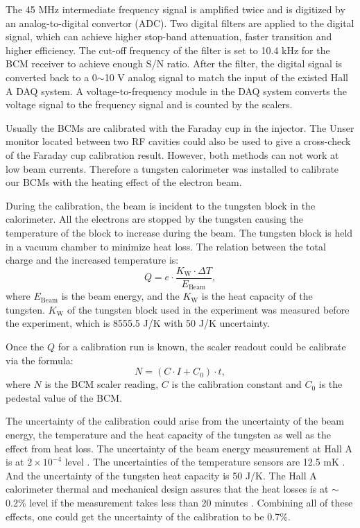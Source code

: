 The 45 MHz intermediate frequency signal is amplified twice and is digitized by an analog-to-digital convertor (ADC). Two digital filters are applied to the digital signal, which can achieve higher stop-band attenuation, faster transition and higher efficiency. The cut-off frequency of the filter is set to 10.4 kHz for the BCM receiver to achieve enough S/N ratio. After the filter, the digital signal is converted back to a 0$\sim$10 V analog signal to match the input of the existed Hall A DAQ system. A voltage-to-frequency module in the DAQ system converts the voltage signal to the frequency signal and is counted by the scalers.

Usually the BCMs are calibrated with the Faraday cup in the injector. The Unser monitor located between two RF cavities could also be used to give a cross-check of the Faraday cup calibration result. However, both methods can not work at low beam currents. Therefore a tungsten calorimeter \cite{Bevins2005} was installed to calibrate our BCMs with the heating effect of the electron beam.

During the calibration, the beam is incident to the tungsten block in the calorimeter. All the electrons are stopped by the tungsten causing the temperature of the block to increase during the beam. The tungsten block is held in a vacuum chamber to minimize heat loss. The relation between the total charge and the increased temperature is:
\begin{equation} \label{C5S2SS2E1}
Q = e\cdot\frac{K_{\mathrm{W}}\cdot\Delta T}{E_{\mathrm{Beam}}},
\end{equation}
where $E_{\mathrm{Beam}}$ is the beam energy, and the $K_{\mathrm{W}}$ is the heat capacity of the tungsten. $K_{\mathrm{W}}$ of the tungsten block used in the experiment was measured before the experiment, which is 8555.5 J/K with 50 J/K uncertainty.

Once the $Q$ for a calibration run is known, the scaler readout could be calibrate via the formula:
\begin{equation} \label{C5S2SS2E2}
N = (C\cdot I+C_0)\cdot t,
\end{equation}
where $N$ is the BCM scaler reading, $C$ is the calibration constant and $C_0$ is the pedestal value of the BCM.

The uncertainty of the calibration could arise from the uncertainty of the beam energy, the temperature and the heat capacity of the tungsten as well as the effect from heat loss. The uncertainty of the beam energy measurement at Hall A is at $2\times10^{-4}$ level \cite{BEAMENERGY}. The uncertainties of the temperature sensors are 12.5 mK \cite{CALORIMETERLEDEX}. And the uncertainty of the tungsten heat capacity is 50 J/K. The Hall A calorimeter thermal and mechanical design assures that the heat losses is at $\sim$0.2\% level if the measurement takes less than 20 minutes \cite{Bevins2005}. Combining all of these effects, one could get the uncertainty of the calibration to be 0.7\%.


